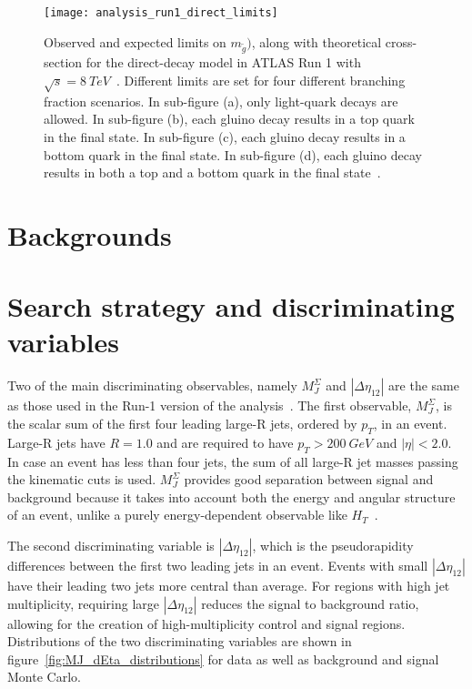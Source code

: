 \begin{figure}[!ht]\centering
    \texttt{[image: analysis\_run1\_direct\_limits]}
    \caption{Observed and expected limits on $m_{\tilde{g}})$, along with theoretical cross-section for the direct-decay model in ATLAS Run 1 with $\sqrt{s}=8~TeV$~\cite{run1-multijet}.
    Different limits are set for four different branching fraction scenarios.
    In sub-figure (a), only light-quark decays are allowed.
    In sub-figure (b), each gluino decay results in a top quark in the final state.
    In sub-figure (c), each gluino decay results in a bottom quark in the final state.
    In sub-figure (d), each gluino decay results in both a top and a bottom quark in the final state~\cite{run1-multijets}.}
    \label{fig:run1_direct_limits}
\end{figure}

\section{Backgrounds}\label{sec:backgrounds}

\section{Search strategy and discriminating variables}\label{sec:search_strategy}

Two of the main discriminating observables, namely $M_J^{\Sigma}$ and $|\Delta\eta_{12}|$ are the same as those used in the Run-1 version of the analysis~\cite{run1-multijet}.
The first observable, $M_J^{\Sigma}$, is the scalar sum of the first four leading large-R jets, ordered by $p_{T}$, in an event.
Large-R jets have $R=1.0$ and are required to have $p_{T} > 200~GeV$ and $|\eta|<2.0$.
In case an event has less than four jets, the sum of all large-R jet masses passing the kinematic cuts is used.
$M_{J}^{\Sigma}$ provides good separation between signal and background because it takes into account both the energy and angular structure of an event, unlike a purely energy-dependent observable like $H_{T}$~\cite{hook-mj,elhedri-mj}.

The second discriminating variable is $|\Delta \eta_{12}|$, which is the pseudorapidity differences between the first two leading jets in an event.
Events with small $|\Delta \eta_{12}|$ have their leading two jets more central than average.
For regions with high jet multiplicity, requiring large $|\Delta \eta_{12}|$ reduces the signal to background ratio, allowing for the creation of high-multiplicity control and signal regions.
Distributions of the two discriminating variables are shown in figure~\ref{fig:MJ_dEta_distributions} for data as well as background and signal Monte Carlo.

